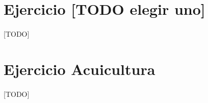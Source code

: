 \documentclass{article}
\begin{document}
  \maketitle

  \section{Ejercicio [TODO elegir uno] }

    \paragraph{}
    [TODO]

  \section{Ejercicio Acuicultura}

    \paragraph{}
    [TODO]
\end{document}
